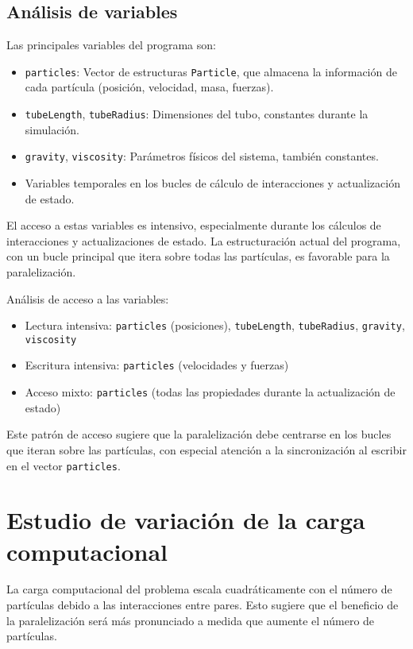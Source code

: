 \documentclass[12pt,a4paper]{article}
\begin{document}
	\subsection{Análisis de variables}
	Las principales variables del programa son:
	\begin{itemize}
		\item \texttt{particles}: Vector de estructuras \texttt{Particle}, que almacena la información de cada partícula (posición, velocidad, masa, fuerzas).
		\item \texttt{tubeLength}, \texttt{tubeRadius}: Dimensiones del tubo, constantes durante la simulación.
		\item \texttt{gravity}, \texttt{viscosity}: Parámetros físicos del sistema, también constantes.
		\item Variables temporales en los bucles de cálculo de interacciones y actualización de estado.
	\end{itemize}
	
	El acceso a estas variables es intensivo, especialmente durante los cálculos de interacciones y actualizaciones de estado. La estructuración actual del programa, con un bucle principal que itera sobre todas las partículas, es favorable para la paralelización.
	
	Análisis de acceso a las variables:
	\begin{itemize}
		\item Lectura intensiva: \texttt{particles} (posiciones), \texttt{tubeLength}, \texttt{tubeRadius}, \texttt{gravity}, \texttt{viscosity}
		\item Escritura intensiva: \texttt{particles} (velocidades y fuerzas)
		\item Acceso mixto: \texttt{particles} (todas las propiedades durante la actualización de estado)
	\end{itemize}
	
	Este patrón de acceso sugiere que la paralelización debe centrarse en los bucles que iteran sobre las partículas, con especial atención a la sincronización al escribir en el vector \texttt{particles}.
	
	\newpage
	
	\section{Estudio de variación de la carga computacional}
	La carga computacional del problema escala cuadráticamente con el número de partículas debido a las interacciones entre pares. Esto sugiere que el beneficio de la paralelización será más pronunciado a medida que aumente el número de partículas.
	
\end{document}
